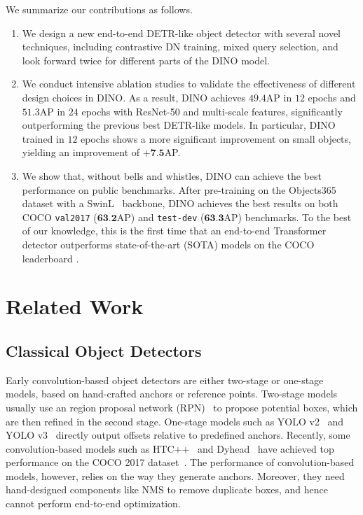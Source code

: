 \documentclass[runningheads]{llncs}
\begin{document}
We summarize our contributions as follows.
\vspace{-0.1cm}
\begin{enumerate}
    \item We design a new end-to-end DETR-like object detector with several novel techniques, including 
contrastive DN training, mixed query selection, and look forward twice for different parts of the DINO model. 
\item We conduct intensive ablation studies to validate the effectiveness of different design choices in DINO. As a result, DINO achieves $49.4$AP in $12$ epochs and $51.3$AP in $24$ epochs with ResNet-50 and multi-scale features, significantly outperforming the previous best DETR-like models. In particular, DINO trained in $12$ epochs shows a more significant improvement on small objects, yielding an improvement of $\textbf{+7.5}$AP.
    \item We show that, without bells and whistles, DINO can achieve the best performance on public benchmarks. After pre-training on the Objects365~\cite{shao2019objects365} dataset with a SwinL~\cite{liu2021swin} backbone, DINO achieves the best results on both COCO \texttt{val2017} ($\textbf{63.2}$AP) and \texttt{test-dev} ($\textbf{63.3}$AP) benchmarks. To the best of our knowledge, this is the first time that an end-to-end Transformer detector outperforms state-of-the-art (SOTA) models on the COCO leaderboard \cite{paperwithcode}.
\end{enumerate}



\section{Related Work}
\subsection{Classical Object Detectors}
Early convolution-based object detectors are either two-stage or one-stage models, based on hand-crafted anchors or reference points. Two-stage models~\cite{ren2015faster,he2017mask} usually use an region proposal network (RPN)~\cite{ren2015faster} to propose potential boxes, which are then refined in the second stage. One-stage models such as YOLO v2~\cite{redmon2017yolo9000} and YOLO v3~\cite{redmon2018yolov3} directly output offsets relative to predefined anchors. Recently, some convolution-based models such as HTC++~\cite{chen2019hybrid} and Dyhead~\cite{dai2021dynamic} have achieved top performance on the COCO 2017 dataset~\cite{lin2015microsoft}. 
The performance of convolution-based models, however, relies on the way they generate anchors. Moreover, they need hand-designed components like NMS to remove duplicate boxes, and hence cannot perform end-to-end optimization.
\end{document}
